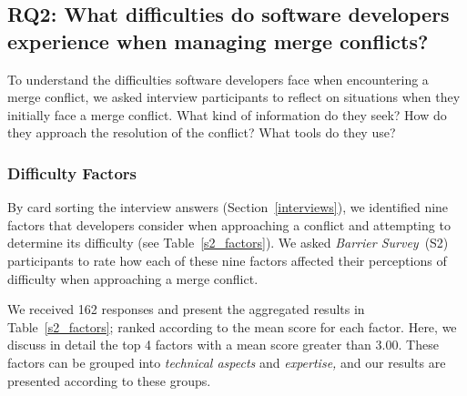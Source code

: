 
\subsection{\textbf{RQ2:} What difficulties do software developers experience when managing merge conflicts?}\label{RQ2}

To understand the difficulties software developers face when encountering a merge conflict, we asked interview participants to reflect on situations when they initially face a merge conflict.
What kind of information do they seek?
How do they approach the resolution of the conflict? 
What tools do they use?

\subsubsection{Difficulty Factors}\label{difficulty-factors}

By card sorting the interview answers (Section~\ref{interviews}), we identified nine factors that developers consider when approaching a conflict and attempting to determine its difficulty (see Table~\ref{s2_factors}). 
We asked \textit{Barrier Survey}~(S2) participants to rate how each of these nine factors affected their perceptions of difficulty when approaching a merge conflict.

We received 162 responses and present the aggregated results in Table~\ref{s2_factors}; ranked according to the mean score for each factor.
Here, we discuss in detail the top 4 factors with a mean score greater than $3.00$.
These factors can be grouped into \textit{technical aspects} and \textit{expertise,} and our results are presented according to these groups.

